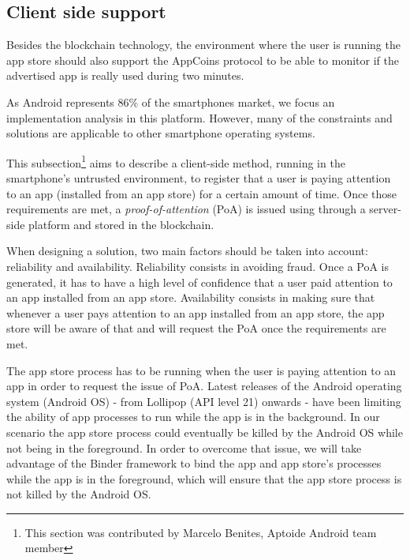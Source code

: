 \subsection{Client side support}

Besides the blockchain technology, the environment where the user is running the app store should 
also support the AppCoins protocol to be able to monitor if the advertised app is really used during two minutes.


As Android represents 86\% of the smartphones market, we focus an implementation analysis in this
platform. However, many of the constraints and solutions are applicable to other smartphone operating systems.

This subsection\footnote{This section was contributed by Marcelo Benites, Aptoide Android team 
member} aims to describe a client-side method, running in the smartphone's untrusted environment, to 
register that a user is paying attention to an app (installed from an app store) for a certain amount of time. Once those requirements are met, a \textit{proof-of-attention} (\textsf{PoA}) is issued using through a server-side platform and stored in the blockchain.
 
When designing a solution, two main factors should be taken into account: reliability and availability. 
Reliability consists in avoiding fraud. Once a \textsf{PoA} is generated, it has to have a high level of 
confidence that a user paid attention to an app installed from an app store. Availability consists in 
making sure that whenever a user pays attention to an app installed from an app store, the app store 
will be aware of that and will request the \textsf{PoA} once the requirements are met. %

The app store process has to be running when the user is paying attention to an app in order to request  
the issue of \textsf{PoA}. Latest releases of the Android operating system (Android OS) - from Lollipop (API 
level 21) onwards - have been limiting the ability of app processes to run while the app is in the 
background. In our scenario the app store process could eventually be killed by the Android OS while 
not being in the foreground. In order to overcome that issue, we will take advantage of the Binder 
framework to bind the app and app store's processes while the app is in the foreground, which will 
ensure that the app store process is not killed by the Android OS. 

